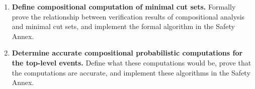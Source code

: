 \begin{enumerate}
\item \textbf{Define compositional computation of minimal cut sets.} Formally prove the relationship between verification results of compositional analysis and minimal cut sets, and implement the formal algorithm in the Safety Annex.

\item \textbf{Determine accurate compositional probabilistic computations for the top-level events.} Define what these computations would be, prove that the computations are accurate, and implement these algorithms in the Safety Annex.


\end{enumerate}
